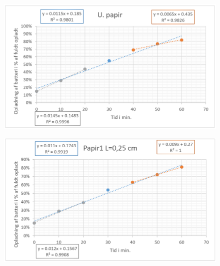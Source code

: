 
\begin{figure}[H]
\centering
\includegraphics[width=1\textwidth]{Setup/forsg2_graf1}
\label{figure:graf1}
\caption{}
\end{figure}

\begin{figure}[H]
\centering
\includegraphics[width=1\textwidth]{Setup/forsg2_graf2}
\label{figure:graf2}
\caption{}
\end{figure}

